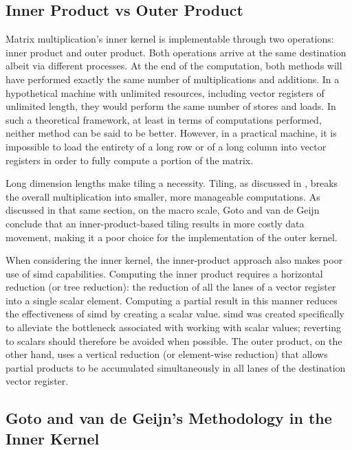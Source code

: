 \documentclass[\main/thesis.tex]{subfiles}
\begin{document}
\subsection{Inner Product vs Outer Product}
\label{sec:productsVs}
Matrix multiplication's inner kernel is implementable through two operations: inner product and outer product.
Both operations arrive at the same destination albeit via different processes.
At the end of the computation, both methods will have performed exactly the same number of multiplications and additions.
In a hypothetical machine with unlimited resources, including vector registers of unlimited length, they would perform the same number of stores and loads.
In such a theoretical framework, at least in terms of computations performed, neither method can be said to be better.
However, in a practical machine, it is impossible to load the entirety of a long row or of a long column into vector registers in order to fully compute a portion of the matrix.

Long dimension lengths make tiling a necessity.
Tiling, as discussed in , breaks the overall multiplication into smaller, more manageable computations.
As discussed in that same section, on the macro scale, Goto and van de Geijn conclude that an inner-product-based tiling results in more costly data movement, making it a poor choice for the implementation of the outer kernel.

When considering the inner kernel, the inner-product approach also makes poor use of \gls{simd} capabilities.
Computing the inner product requires a horizontal reduction (or tree reduction): the reduction of all the \glspl{lane} of a vector register into a single scalar element.
Computing a partial result in this manner reduces the effectiveness of \gls{simd} by creating a scalar value.
\Gls{simd} was created specifically to alleviate the bottleneck associated with working with scalar values; reverting to scalars should therefore be avoided when possible.
The outer product, on the other hand, uses a vertical reduction (or element-wise reduction) that allows partial products to be accumulated simultaneously in all \glspl{lane} of the destination vector register.

\subsection{Goto and van de Geijn's Methodology in the Inner Kernel}
\label{sec:gotoInner}
\end{document}
